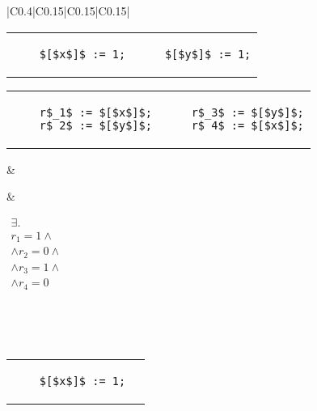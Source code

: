 \begin{table}
\begin{tabular}{|C{0.4\textwidth}|C{0.15\textwidth}|C{0.15\textwidth}|C{0.15\textwidth}|}
      \\ \hline
    
    \begin{tabular}{@{\hskip -15pt}l|@{\hskip 5pt}|@{\hskip -15pt}l}
    \begin{lstlisting}
    $[$x$]$ := 1;
    \end{lstlisting}
    &
    \begin{lstlisting}
    $[$y$]$ := 1;
    \end{lstlisting}
    \end{tabular}
    
    \vspace{5pt}
    
    \begin{tabular}{@{\hskip -15pt}l|@{\hskip 5pt}|@{\hskip -15pt}l}
    \begin{lstlisting}
    r$_1$ := $[$x$]$;
    r$_2$ := $[$y$]$;
    \end{lstlisting}
    &
    \begin{lstlisting}
    r$_3$ := $[$y$]$;
    r$_4$ := $[$x$]$;
    \end{lstlisting}
    \end{tabular}
    
    &
    
    
    &
    
    $\begin{aligned}
      \exists. \\ r_1 = 1 \wedge \\ 
        \wedge r_2 = 0 \wedge \\ \wedge r_3 = 1 \wedge \\ \wedge r_4 = 0 
    \end{aligned}$
    
    \\ \hline
    
      \\ \hline
    
    \begin{tabular}{@{\hskip -15pt}l @{\hskip 5pt} @{\hskip -15pt}l}
    \begin{lstlisting}
    $[$x$]$ := 1;
    \end{lstlisting}
    &


\end{tabular}
\end{tabular}
\end{table}
